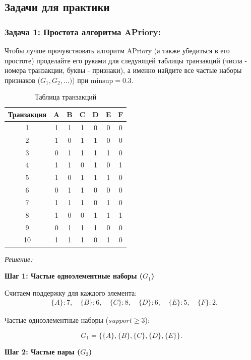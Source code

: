 \subsection{Задачи для практики}

\subsubsection{Задача 1: Простота алгоритма APriory:} Чтобы лучше прочувствовать алгоритм APriory (а также убедиться в его простоте) проделайте его руками для следующей таблицы транзакций (числа - номера транзакции, буквы - признаки), а именно найдите все частые наборы признаков (\(G_1, G_2, \ldots)\)) при \( \text{minsup}=0.3 \).
\begin{table}[h!]
\centering
\caption{Таблица транзакций}
\begin{tabular}{ccccccc}
\toprule
\textbf{Транзакция} & \textbf{A} & \textbf{B} & \textbf{C} & \textbf{D} & \textbf{E} & \textbf{F} \\
\midrule
1  & 1 & 1 & 1 & 0 & 0 & 0 \\
2  & 1 & 0 & 1 & 1 & 0 & 0 \\
3  & 0 & 1 & 1 & 1 & 1 & 0 \\
4  & 1 & 1 & 0 & 1 & 0 & 1 \\
5  & 1 & 0 & 1 & 1 & 1 & 0 \\
6  & 0 & 1 & 1 & 0 & 0 & 0 \\
7  & 1 & 1 & 1 & 0 & 1 & 0 \\
8  & 1 & 0 & 0 & 1 & 1 & 1 \\
9  & 0 & 1 & 1 & 1 & 0 & 0 \\
10 & 1 & 1 & 1 & 0 & 1 & 0 \\
\bottomrule
\end{tabular}
\end{table}
\newline
\textit{Решение:}

\textbf{Шаг 1: Частые одноэлементные наборы (\( G_1 \))}

Считаем поддержку для каждого элемента:
\[
\begin{aligned}
&\{A\}: 7, \quad \{B\}: 6, \quad \{C\}: 8, \quad \{D\}: 6, \quad \{E\}: 5, \quad \{F\}: 2.
\end{aligned}
\]

Частые одноэлементные наборы (\( support \geq 3 \)):

\[
G_1 = \{\{A\}, \{B\}, \{C\}, \{D\}, \{E\}\}.
\]

\textbf{Шаг 2: Частые пары (\( G_2 \))}

